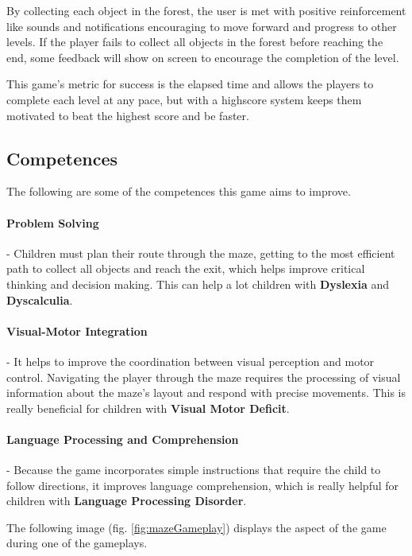 By collecting each object in the forest, the user is met with positive reinforcement like sounds and notifications encouraging to move forward and progress to other levels. If the player fails to collect all objects in the forest before reaching the end, some feedback will show on screen to encourage the completion of the level.

This game's metric for success is the elapsed time and allows the players to complete each level at any pace, but with a highscore system keeps them motivated to beat the highest score and be faster.

\subsection{Competences}
The following are some of the competences this game aims to improve.

\paragraph{Problem Solving}- Children must plan their route through the maze, getting to the most efficient path to collect all objects and reach the exit, which helps improve critical thinking and decision making. This can help a lot children with \textbf{Dyslexia} and \textbf{Dyscalculia}.

\paragraph{Visual-Motor Integration}- It helps to improve the coordination between visual perception and motor control. Navigating the player through the maze requires the processing of visual information about the maze's layout and respond with precise movements. This is really beneficial for children with \textbf{Visual Motor Deficit}.

\paragraph{Language Processing and Comprehension}- Because the game incorporates simple instructions that require the child to follow directions, it improves language comprehension, which is really helpful for children with \textbf{Language Processing Disorder}.

The following image (fig. \ref{fig:mazeGameplay}) displays the aspect of the game during one of the gameplays.

